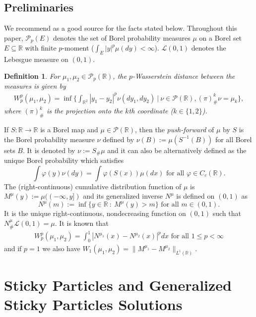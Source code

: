 \documentclass[11pt]{article}
\newtheorem{definition}[theorem]{Definition}
\numberwithin{equation}{section}
\begin{document}
    \subsection{Preliminaries}
    We recommend \cite{Villani} as a good source for the facts stated below. 
        Throughout this paper, $\mathcal{P}_p(E)$ denotes the set of Borel probability measures $\mu$ on a Borel set $E\subseteq\mathbb{R}$ with finite $p$-moment ($\int_E|y|^p\mu(dy)<\infty$). $\mathcal{L}(0,1)$ denotes the Lebesgue measure on $(0,1)$.
            \begin{definition}
                For $\mu_1,\mu_2\in\mathcal{P}_p(\mathbb{R})$, the \emph{$p$-Wasserstein distance} between the measures is given by 
                \begin{align*}
                    W_p^p(\mu_1,\mu_2)=\inf\Bigg\{\int_{\mathbb{R}^2}|y_1-y_2|^p\nu(dy_1,dy_2)\ | \ \nu\in\mathcal{P}(\mathbb{R}), (\pi)_\#^k\nu=\mu_k\Bigg\},
                \end{align*}
                where $(\pi)_\#^k$ is the projection onto the $k$th coordinate ($k\in\{1,2\}$). 
            \end{definition}
            If $S:\mathbb{R}\rightarrow\mathbb{R}$ is a Borel map and $\mu\in\mathcal{P}(\mathbb{R})$, then the {\it push-forward} of $\mu$ by $S$ is the Borel probability measure $\nu$ defined by $\nu(B):=\mu(S^{-1}(B))$ for all Borel sets $B$. It is denoted by $\nu:=S_\#\mu$ and it can also be alternatively defined as the unique Borel probability which satisfies
            $$\int\varphi(y)\nu(dy)=\int\varphi(S(x))\mu(dx)\mbox{ for all }\varphi\in C_c(\mathbb{R}).$$
            The (right-continuous) cumulative distribution function of $\mu$ is $M^{\mu}(y):=\mu((-\infty,y])$ and its generalized inverse $N^{\mu}$ is defined on $(0,1)$ as 
            $$N^{\mu}(m):=\inf\{y\in\mathbb{R}\ :\ M^{\mu}(y)>m\}\mbox{ for all }m\in(0,1).$$ 
            It is the unique right-continuous, nondecreasing function on $(0,1)$ such that $N^\mu_\#\mathcal{L}(0,1)=\mu$.
            It is known that 
            \begin{align}\nonumber
                W_p^p(\mu_1,\mu_2)=\int_0^1|N^{\mu_1}(x)-N^{\mu_2}(x)|^pdx\mbox{ for all }1\leq p<\infty
            \end{align}
            and if $p=1$ we also have $W_1(\mu_1,\mu_2)=\|M^{\mu_1}-M^{\mu_2}\|_{L^1(\mathbb{R})}$. 
            
      
\section{Sticky Particles and Generalized Sticky Particles Solutions}
\end{document}
